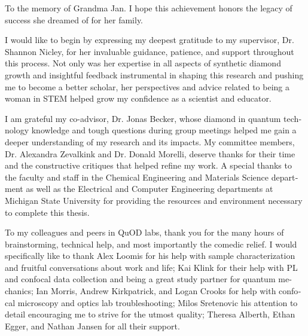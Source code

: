 \documentclass{msuphddissertation_ssn}
\begin{document}
\begin{otherlanguage}{english}
\begin{dedication} 
To the memory of Grandma Jan. I hope this achievement honors the legacy of success she dreamed of for her family. 
\end{dedication}

\begin{acknowledgment}
\indent 

I would like to begin by expressing my deepest gratitude to my supervisor, Dr. Shannon Nicley, for her invaluable guidance, patience, and support throughout this process. Not only was her expertise in all aspects of synthetic diamond growth and insightful feedback instrumental in shaping this research and pushing me to become a better scholar, her perspectives and advice related to being a woman in STEM helped grow my confidence as a scientist and educator.

I am grateful my co-advisor, Dr. Jonas Becker, whose diamond in quantum technology knowledge and tough questions during group meetings helped me gain a deeper understanding of my research and its impacts. My committee members, Dr. Alexandra Zevalkink and Dr. Donald Morelli, deserve thanks for their time and the constructive critiques that helped refine my work. A special thanks to the faculty and staff in the Chemical Engineering and Materials Science department as well as the Electrical and Computer Engineering departments at Michigan State University for providing the resources and environment necessary to complete this thesis.

To my colleagues and peers in QuOD labs, thank you for the many hours of brainstorming, technical help, and most importantly the comedic relief. I would specifically like to thank Alex Loomis for his help with sample characterization and fruitful conversations about work and life; Kai Klink for their help with PL and confocal data collection and being a great study partner for quantum mechanics; Ian Morris, Andrew Kirkpatrick, and Logan Crooks for help with confocal microscopy and optics lab troubleshooting; Milos Sretenovic his attention to detail encouraging me to strive for the utmost quality; Theresa Alberth, Ethan Egger, and Nathan Jansen for all their support.


\end{acknowledgment}
\end{otherlanguage}
\end{document}
